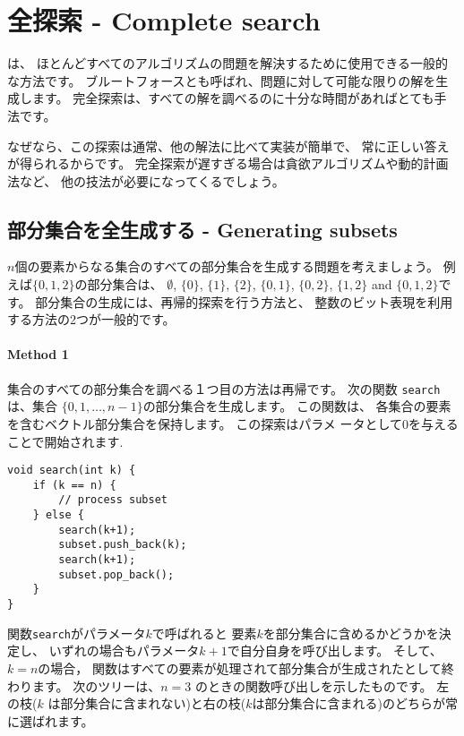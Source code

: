 \chapter{全探索 - Complete search}

は、
ほとんどすべてのアルゴリズムの問題を解決するために使用できる一般的な方法です。
ブルートフォースとも呼ばれ、問題に対して可能な限りの解を生成します。
完全探索は、すべての解を調べるのに十分な時間があればとても手法です。

なぜなら、この探索は通常、他の解法に比べて実装が簡単で、
常に正しい答えが得られるからです。
完全探索が遅すぎる場合は貪欲アルゴリズムや動的計画法など、
他の技法が必要になってくるでしょう。

\section{部分集合を全生成する - Generating subsets}


$n$個の要素からなる集合のすべての部分集合を生成する問題を考えましょう。
例 えば$\{0,1,2\}$の部分集合は、
$\emptyset$, $\{0\}$, $\{1\}$, $\{2\}$, $\{0,1\}$,
$\{0,2\}$, $\{1,2\}$ and $\{0,1,2\}$です。
部分集合の生成には、再帰的探索を行う方法と、
整数のビット表現を利用する方法の2つが一般的です。

\subsubsection{Method 1}

集合のすべての部分集合を調べる１つ目の方法は再帰です。
次の関数 \texttt{search}は、集合 $\{0,1,\ldots,n-1\}$の部分集合を生成します。
この関数は、
各集合の要素を含むベクトル部分集合を保持します。
この探索はパラメ ータとして0を与えることで開始されます.

\begin{lstlisting}
void search(int k) {
    if (k == n) {
        // process subset
    } else {
        search(k+1);
        subset.push_back(k);
        search(k+1);
        subset.pop_back();
    }
}
\end{lstlisting}

関数\texttt{search}がパラメータ$k$で呼ばれると
要素$k$を部分集合に含めるかどうかを決定し、
いずれの場合もパラメータ$k + 1$で自分自身を呼び出します。
そして、$k = n$の場合，
関数はすべての要素が処理されて部分集合が生成されたとして終わります。
次のツリーは、$n = 3$ のときの関数呼び出しを示したものです。
左の枝($k$ は部分集合に含まれない)と右の枝($k$は部分集合に含まれる)のどちらが常に選ばれます。

